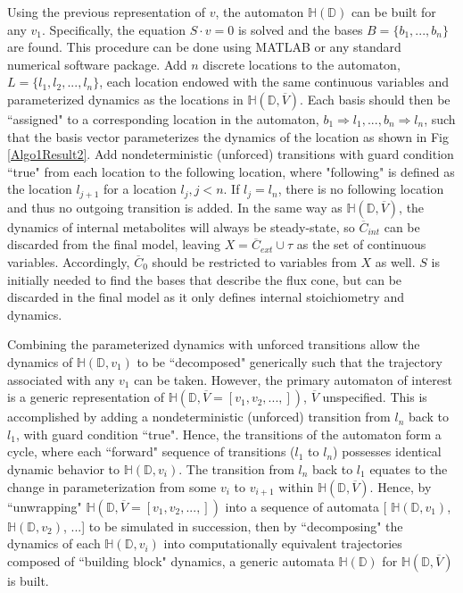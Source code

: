 Using the previous representation of $v$, the automaton $\mathbb{H}(\mathbb{D})$ can be built for any $v_1$. Specifically, the equation $S \cdot v = 0$ is solved and the bases $B = \{b_1, ..., b_n\}$ are found. This procedure can be done using MATLAB or any standard numerical software package. Add $n$ discrete locations to the automaton, $L = \{ l_1, l_2, ..., l_n \}$, each location endowed with the same continuous variables and parameterized dynamics as the locations in $\mathbb{H}(\mathbb{D}, \overline{V})$. Each basis should then be ``assigned" to a corresponding location in the automaton, $b_1 \Rightarrow l_1, ..., b_n \Rightarrow l_n$, such that the basis vector parameterizes the dynamics of the location as shown in Fig \ref{Algo1Result2}. Add nondeterministic (unforced) transitions with guard condition ``true" from each location to the following location, where "following" is defined as the location $l_{j+1}$ for a location $l_j, j < n$. If $l_j = l_n$, there is no following location and thus no outgoing transition is added. In the same way as $\mathbb{H}(\mathbb{D},\overline{V})$, the dynamics of internal metabolites will always be steady-state, so $\overline{C}_{int}$ can be discarded from the final model, leaving $X = \overline{C}_{ext} \cup {\tau}$ as the set of continuous variables. Accordingly, $\overline{C}_{0}$ should be restricted to variables from $X$ as well. $S$ is initially needed to find the bases that describe the flux cone, but can be discarded in the final model as it only defines internal stoichiometry and dynamics.

Combining the parameterized dynamics with unforced transitions allow the dynamics of $\mathbb{H}(\mathbb{D},v_1)$ to be ``decomposed" generically such that the trajectory associated with any $v_1$ can be taken. However, the primary automaton of interest is a generic representation of $\mathbb{H}(\mathbb{D},\overline{V} = [v_1, v_2, ...,])$, $\overline{V}$ unspecified. This is accomplished by adding a nondeterministic (unforced) transition from $l_n$ back to $l_1$, with guard condition ``true". Hence, the transitions of the automaton form a cycle, where each ``forward" sequence of transitions ($l_1$ to $l_n$) possesses identical dynamic behavior to $\mathbb{H}(\mathbb{D},v_i)$. The transition from $l_n$ back to $l_1$ equates to the change in parameterization from some $v_i$ to $v_{i+1}$ within $\mathbb{H}(\mathbb{D},\overline{V})$. Hence, by ``unwrapping" $\mathbb{H}(\mathbb{D},\overline{V}=[v_1, v_2, ...,])$ into a sequence of automata [ $\mathbb{H}(\mathbb{D},v_1)$, $\mathbb{H}(\mathbb{D},v_2)$, ...] to be simulated in succession, then by ``decomposing" the dynamics of each $\mathbb{H}(\mathbb{D},v_i)$ into computationally equivalent trajectories composed of ``building block" dynamics, a generic automata $\mathbb{H}(\mathbb{D})$ for $\mathbb{H}(\mathbb{D},\overline{V})$ is built.


